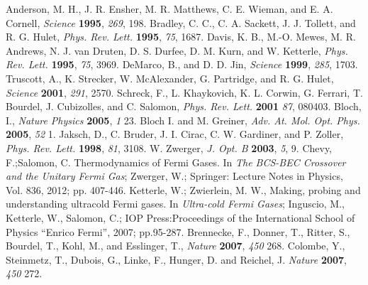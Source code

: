 \documentclass[journal,article,accept,moreauthors,pdftex,12pt,a4paper]{mdpi}
\begin{document}

\makeatletter
\renewcommand\@biblabel[1]{#1. }
\makeatother
\begin{thebibliography}{999} %
Anderson, M. H., J. R. Ensher, M. R. Matthews, C. E. Wieman, and E. A. Cornell, {\em Science} {\bf 1995}, {\em 269}, 198.
Bradley, C. C., C. A. Sackett, J. J. Tollett, and R. G. Hulet, {\em Phys. Rev. Lett.} {\bf 1995}, {\em 75}, 1687.
Davis, K. B., M.-O. Mewes, M. R. Andrews, N. J. van Druten, D. S. Durfee, D. M. Kurn, and W. Ketterle, {\em Phys. Rev. Lett.} {\bf 1995}, {\em 75}, 3969.
DeMarco, B., and D. D. Jin, {\em Science} {\bf 1999}, {\em 285}, 1703.
Truscott, A., K. Strecker, W. McAlexander, G. Partridge, and R. G. Hulet, {\em Science} {\bf 2001}, {\em 291}, 2570.
Schreck, F., L. Khaykovich, K. L. Corwin, G. Ferrari, T. Bourdel, J. Cubizolles, and C. Salomon, {\em Phys. Rev. Lett.} {\bf 2001} {\em 87}, 080403.
Bloch, I., {\em Nature Physics} {\bf 2005}, {\em 1} 23. 
Bloch I. and M. Greiner, {\em Adv. At. Mol. Opt. Phys.} {\bf 2005}, {\em 52} 1.
Jaksch, D., C. Bruder, J. I. Cirac, C. W. Gardiner, and P. Zoller, {\em Phys. Rev. Lett.} {\bf 1998}, {\em 81}, 3108.
W. Zwerger, {\em J. Opt. B} {\bf 2003}, {\em 5}, 9.
Chevy, F.;Salomon, C. Thermodynamics of Fermi Gases. In {\em The BCS-BEC Crossover and the Unitary Fermi Gas}; Zwerger, W.; Springer: Lecture Notes in Physics, Vol. 836, 2012; pp. 407-446.
Ketterle, W.; Zwierlein, M. W., Making, probing and understanding ultracold Fermi gases. In {\em Ultra-cold Fermi Gases}; Inguscio, M., Ketterle, W., Salomon, C.; IOP Press:Proceedings of the International School of Physics ``Enrico Fermi'', 2007; pp.95-287.
Brennecke, F., Donner, T., Ritter, S., Bourdel, T., Kohl, M., and Esslinger, T., {\em Nature} {\bf 2007}, {\em 450} 268.
Colombe, Y., Steinmetz, T., Dubois, G., Linke, F., Hunger, D. and Reichel, J. {\em Nature} {\bf 2007}, {\em 450} 272.

\end{thebibliography}
\end{document}
